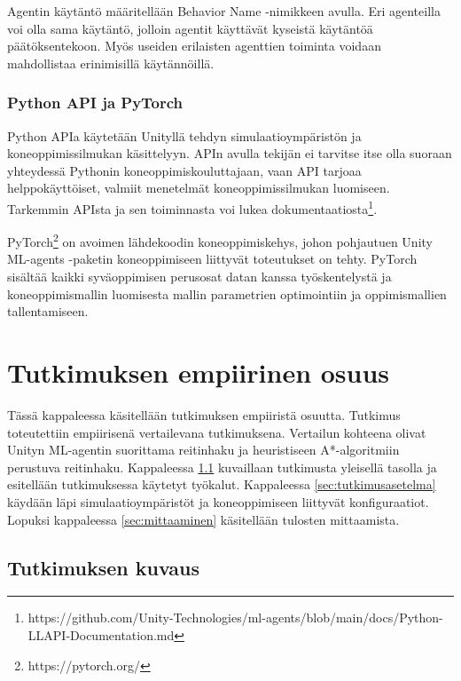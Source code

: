 \documentclass[utf8]{gradu3}
\begin{document}
Agentin käytäntö määritellään Behavior Name -nimikkeen avulla. Eri agenteilla voi olla sama käytäntö, jolloin agentit käyttävät kyseistä käytäntöä päätöksentekoon. Myös useiden erilaisten agenttien toiminta voidaan mahdollistaa erinimisillä käytännöillä.

\subsection{Python API ja PyTorch}

Python APIa käytetään Unityllä tehdyn simulaatioympäristön ja koneoppimissilmukan käsittelyyn. APIn avulla tekijän ei tarvitse itse olla suoraan yhteydessä Pythonin koneoppimiskouluttajaan, vaan API tarjoaa helppokäyttöiset, valmiit menetelmät koneoppimissilmukan luomiseen. Tarkemmin APIsta ja sen toiminnasta voi lukea dokumentaatiosta\footnote{https://github.com/Unity-Technologies/ml-agents/blob/main/docs/Python-LLAPI-Documentation.md}.

PyTorch\footnote{https://pytorch.org/} on avoimen lähdekoodin koneoppimiskehys, johon pohjautuen Unity ML-agents -paketin koneoppimiseen liittyvät toteutukset on tehty. PyTorch sisältää kaikki syväoppimisen perusosat datan kanssa työskentelystä ja koneoppimismallin luomisesta mallin parametrien optimointiin ja oppimismallien tallentamiseen.

\chapter{Tutkimuksen empiirinen osuus}
\label{empiirinen}

Tässä kappaleessa käsitellään tutkimuksen empiiristä osuutta. Tutkimus toteutettiin empiirisenä vertailevana tutkimuksena. Vertailun kohteena olivat Unityn ML-agentin suorittama reitinhaku ja heuristiseen A*-algoritmiin perustuva reitinhaku. Kappaleessa \ref{sec:tutkimuksenkuvaus} kuvaillaan tutkimusta yleisellä tasolla ja esitellään tutkimuksessa käytetyt työkalut. Kappaleessa \ref{sec:tutkimusasetelma} käydään läpi simulaatioympäristöt ja koneoppimiseen liittyvät konfiguraatiot. Lopuksi kappaleessa \ref{sec:mittaaminen} käsitellään tulosten mittaamista.

\section{Tutkimuksen kuvaus}
\label{sec:tutkimuksenkuvaus}
\end{document}
